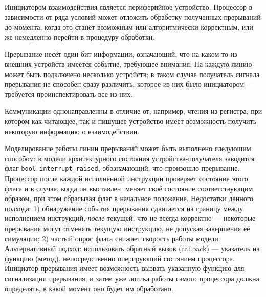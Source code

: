 \begin{itemize*}
\item Инициатором взаимодействия является периферийное  уст\-ройст\-во. Процессор в зависимости от ряда условий может отложить обработку полученных прерываний до момента, когда это станет возможным или алгоритмически корректным, или же немедленно перейти в процедуру обработки.

\item Прерывание несёт один бит информации, означающий, что на каком-то из внешних устройств имеется событие, требующее внимания. На каждую линию может быть подключено несколько устройств; в таком случае получатель сигнала прерывания не способен сразу различить, которое из них было инициатором — требуется проинспектировать все из них.

\item Коммуникации однонаправленны в отличие от, например, чтения из регистра, при котором как читающее, так и пишушее устройство имеет возможность получить некоторую информацию о взаимодействии.
\end{itemize*}



Моделирование работы линии прерываний может быть выполнено следующим способом: в модели архитектурного состояния устройства-получателя заводится флаг \texttt{bool interrupt_raised}, обозначающий, что произошло прерывание. Процессор после каждой исполненной инструкции проверяет состояние этого флага и в случае, когда он выставлен, меняет своё состояние соответствующим образом, при этом сбрасывая флаг в начальное положение. Недостатки данного подхода: 1) обнаружение события прерывания сдвигается на границу между исполнением инструкций, \emph{после} текущей, что не всегда корректно — некоторые прерывания могут отменять текущую инструкцию, не допуская завершения её симуляции; 2) частый опрос флага снижает скорость работы модели. Альтернативный подход: использовать обратный вызов (\abbr callback) — указатель на функцию (метод), непосредственно оперирующий состянием процессора. Инициатор прерывания имеет возможность вызвать указанную функцию для сигнализации прерывания, и затем уже логика работы самого процессора должна определять, в какой момент оно будет им обработано.

